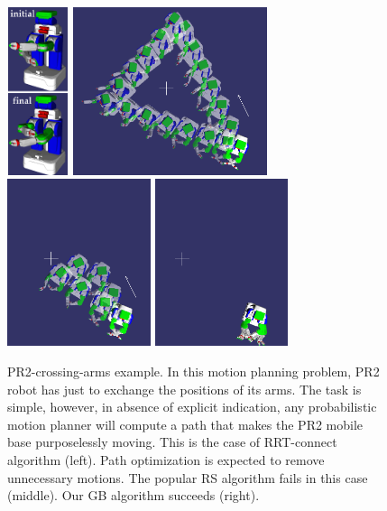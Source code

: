 \documentclass{tADR2e}
\begin{document}
\begin{figure}
	\centering
	\includegraphics[height=4.9cm,width=1.8cm]{pr2_initial_final_vertical.png}
	\includegraphics[width=5.7cm]{p0_pr2_alone_merged3.png}
	\includegraphics[height=4.9cm]{p1RS_pr2_alone_merged3.png}
	\includegraphics[height=4.9cm]{p1GB_pr2_alone_merged3.png}\\
	\caption{PR2-crossing-arms example. In this motion planning problem, PR2 robot 
	has just to 
exchange the positions of its arms. The task is simple, however, in absence of 
explicit indication, any probabilistic motion planner will compute a path that 
makes the PR2 mobile base purposelessly moving. This is the case of RRT-connect 
algorithm (left). Path optimization is expected to remove unnecessary motions. 
The popular RS algorithm fails in this case (middle). Our GB algorithm 
succeeds (right).}
	\label{pr2_final}
\end{figure}
\end{document}
